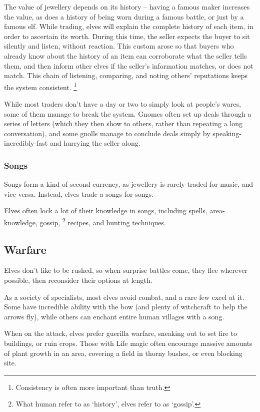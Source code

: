 \begin{multicols}{2}
The value of jewellery depends on its history -- having a famous maker increases the value, as does a history of being worn during a famous battle, or just by a famous elf.
While trading, elves will explain the complete history of each item, in order to ascertain its worth.
During this time, the seller expects the buyer to sit silently and listen, without reaction.
This custom arose so that buyers who already know about the history of an item can corroborate what the seller tells them, and then inform other elves if the seller's information matches, or does not match.
This chain of listening, comparing, and noting others' reputations keeps the system consistent.%
\footnote{Consistency is often more important than truth.}

While most traders don't have a day or two to simply look at people's wares, some of them manage to break the system.
Gnomes often set up deals through a series of letters (which they then show to others, rather than repeating a long conversation), and some gnolls manage to conclude deals simply by {\small speaking-incredibly-fast} and hurrying the seller along.

\subsubsection{Songs}

Songs form a kind of second currency, as jewellery is rarely traded for music, and vice-versa.
Instead, elves trade a songs for songs.

Elves often lock a lot of their knowledge in songs, including spells, \gls{area}-knowledge, gossip,%
\footnote{What human refer to as `history', elves refer to as `gossip'.}
recipes, and hunting techniques.

\subsection{Warfare}

Elves don't like to be rushed, so when surprise battles come, they flee wherever possible, then reconsider their options at length.

As a society of specialists, most elves avoid combat, and a rare few excel at it.
Some have incredible ability with the bow (and plenty of witchcraft to help the arrows fly), while others can enchant entire human \glspl{village} with a song.

When on the attack, elves prefer guerilla warfare, sneaking out to set fire to buildings, or ruin crops.
Those with Life magic often encourage massive amounts of plant growth in an area, covering a field in thorny bushes, or even blocking site.


\end{multicols}
